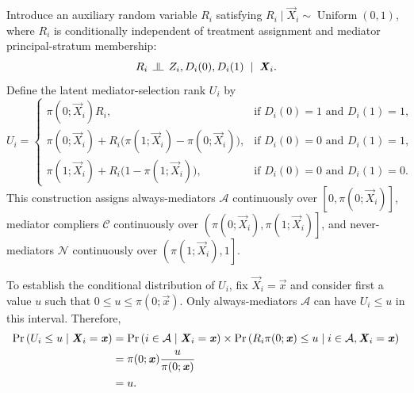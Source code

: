 Introduce an auxiliary random variable $R_i$ satisfying $
    R_i
    \mid
    \vec X_i
    \sim
    \operatorname{Uniform}(0,1)$,
where $R_i$ is conditionally independent of treatment assignment and mediator principal-stratum membership:
\[
    R_i
    \;\indep\;
        Z_i,
        D_i(0),
        D_i(1)
    \; \mid \;
    \vec X_i.
    \label{eqn:appendix-auxiliary-independence}
\]
Define the latent mediator-selection rank $U_i$ by
\[
    U_i
    =
    \begin{cases}
        \pi(0;\vec X_i)R_i,
        &
        \text{if }
        D_i(0)=1
        \text{ and }
        D_i(1)=1,
        \\[6pt]
        \pi(0;\vec X_i)
        +
        R_i \Big(
            \pi(1;\vec X_i)
            -
            \pi(0;\vec X_i)
        \Big),
        &
        \text{if }
        D_i(0)=0
        \text{ and }
        D_i(1)=1,
        \\[6pt]
        \pi(1;\vec X_i)
        +
        R_i\Big(
            1-\pi(1;\vec X_i)
        \Big),
        &
        \text{if }
        D_i(0)=0
        \text{ and }
        D_i(1)=0.
    \end{cases}
\]
This construction assigns always-mediators $\mathcal A$ continuously over
    $\left[
        0,
        \pi(0;\vec X_i)
    \right]$,
mediator compliers $\mathcal C$ continuously over
$
    \left(
        \pi(0;\vec X_i),
        \pi(1;\vec X_i)
    \right]$,
and never-mediators $\mathcal N$ continuously over
$    \left(
        \pi(1;\vec X_i),
        1
    \right]$.

To establish the conditional distribution of $U_i$, fix $\vec X_i=\vec x$ and consider first a value $u$ such that
$    0
    \leq
    u
    \leq
    \pi(0;\vec x)$.
Only always-mediators $\mathcal A$ can have $U_i\leq u$ in this interval.
Therefore,
\[
    \begin{aligned}
    \Pr\left( 
        U_i\leq u
        \mid
        \boldsymbol{\mathit{X}}_i=\boldsymbol{\mathit{x}}
     \right)
    &=
    \Pr\left( 
        i \in \mathcal A
        \mid
        \boldsymbol{\mathit{X}}_i=\boldsymbol{\mathit{x}}
     \right) \times
    \Pr\left( 
        R_i\pi(0;\boldsymbol{\mathit{x}}) \leq u
        \mid
        i \in \mathcal A,\boldsymbol{\mathit{X}}_i=\boldsymbol{\mathit{x}}
     \right)
    \\
    &=
    \pi(0;\boldsymbol{\mathit{x}})
    \frac{u}{\pi(0;\boldsymbol{\mathit{x}})}
    \\
    &=
    u.
    \end{aligned}
    \label{eqn:appendix-uniform-proof-always}
\]

